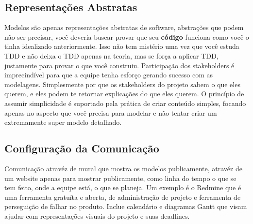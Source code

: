 \documentclass[conference]{IEEEtran}
\begin{document}
\subsection{Representações Abstratas}
Modelos são apenas representações abstratas de software, abstrações que podem não ser precisar, você deveria buscar provar que seu {\bfseries código} funciona como você o tinha idealizado anteriormente. Isso não tem mistério uma vez que você estuda TDD e não deixa o TDD apenas na teoria, mas se força a aplicar TDD, justamente para provar o que você construiu. Participação dos stakeholders é imprecindível para que a equipe tenha esforço gerando sucesso com as modelagens. Simplesmente por que os stakeholders do projeto sabem o que eles querem, e eles podem te retornar explicações do que eles querem. O princípio de assumir simplicidade é suportado pela prática de criar conteúdo simples, focando apenas no aspecto que você precisa para modelar e não tentar criar um extremamente super modelo detalhado.

\subsection{Configuração da Comunicação}
Comunicação atravéz de mural que mostra os modelos publicamente, atravéz de um website apenas para mostrar publicamente, como linha do tempo o que se tem feito, onde a equipe está, o que se planeja. Um exemplo é o Redmine que é uma ferramenta gratuíta e aberta, de administração de projeto e ferramenta de perseguição de falhar no produto. Inclue calendário e diagramas Gantt que visam ajudar com representações visuais do projeto e suas deadlines.
\end{document}

